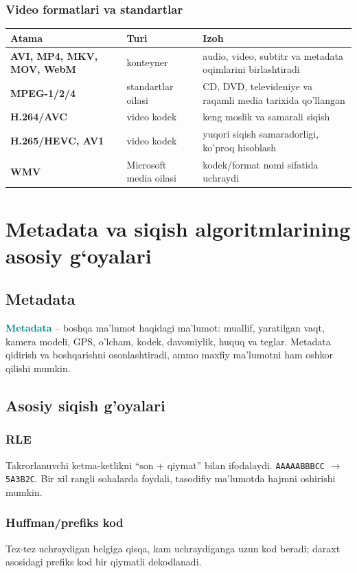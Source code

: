 \documentclass[11pt,a4paper,oneside]{book}
\newcommand{\term}[1]{\textbf{\textcolor{Teal}{#1}}\index{#1}}
\begin{document}
\subsubsection{Video formatlari va standartlar}
\begin{tabularx}{\textwidth}{>{\sffamily\bfseries}p{}p{}X}
\toprule
Atama & Turi & Izoh\\
\midrule
AVI, MP4, MKV, MOV, WebM & konteyner & audio, video, subtitr va metadata oqimlarini birlashtiradi\\
MPEG-1/2/4 & standartlar oilasi & CD, DVD, televideniye va raqamli media tarixida qo'llangan\\
H.264/AVC & video kodek & keng moslik va samarali siqish\\
H.265/HEVC, AV1 & video kodek & yuqori siqish samaradorligi, ko'proq hisoblash\\
WMV & Microsoft media oilasi & kodek/format nomi sifatida uchraydi\\
\bottomrule
\end{tabularx}
\section{Metadata va siqish algoritmlarining asosiy g‘oyalari}
\subsection{Metadata}
\term{Metadata} -- boshqa ma'lumot haqidagi ma'lumot: muallif, yaratilgan vaqt, kamera modeli, GPS, o'lcham, kodek, davomiylik, huquq va teglar. Metadata qidirish va boshqarishni osonlashtiradi, ammo maxfiy ma'lumotni ham oshkor qilishi mumkin.
\subsection{Asosiy siqish g'oyalari}
\subsubsection{RLE}
Takrorlanuvchi ketma-ketlikni ``son + qiymat'' bilan ifodalaydi. \texttt{AAAAABBBCC} $\rightarrow$ \texttt{5A3B2C}. Bir xil rangli sohalarda foydali, tasodifiy ma'lumotda hajmni oshirishi mumkin.

\subsubsection{Huffman/prefiks kod}
Tez-tez uchraydigan belgiga qisqa, kam uchraydiganga uzun kod beradi; daraxt asosidagi prefiks kod bir qiymatli dekodlanadi.
\end{document}
